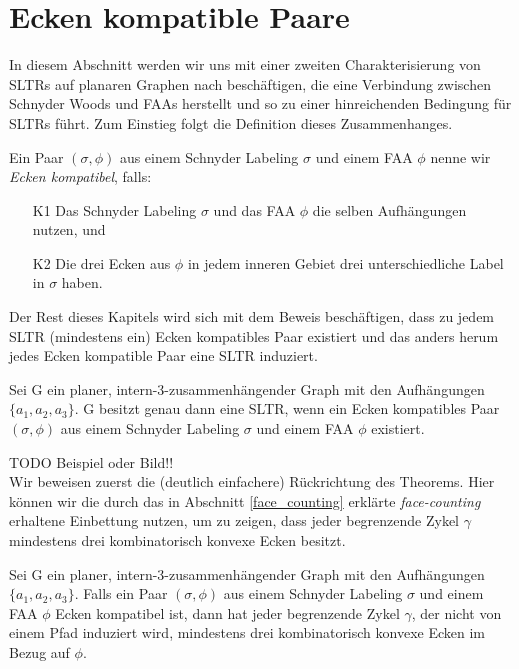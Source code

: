 \section{Ecken kompatible Paare}

In diesem Abschnitt werden wir uns mit einer zweiten Charakterisierung von SLTRs auf planaren Graphen nach \cite{af15} beschäftigen, die eine Verbindung zwischen Schnyder Woods und FAAs herstellt und so zu einer hinreichenden Bedingung für SLTRs führt. Zum Einstieg folgt die Definition dieses Zusammenhanges.

\begin{definition}\label{def_ccc}
Ein Paar $(\sigma,\phi)$ aus einem Schnyder Labeling $\sigma$ und einem FAA $\phi$ nenne wir \textit{Ecken kompatibel}, falls:
\begin{itemize}
\item [K1] Das Schnyder Labeling $\sigma$ und das FAA $\phi$ die selben Aufhängungen nutzen, und
\item [K2] Die drei Ecken aus $\phi$ in jedem inneren Gebiet drei unterschiedliche Label in $\sigma$ haben.
\end{itemize}
\end{definition}

Der Rest dieses Kapitels wird sich mit dem Beweis beschäftigen, dass zu jedem SLTR (mindestens ein) Ecken kompatibles Paar existiert und das anders herum jedes Ecken kompatible Paar eine SLTR induziert.

\begin{theorem}
\label{theo_ccc}
Sei G ein planer, intern-3-zusammenhängender Graph mit den Aufhängungen $\{a_1,a_2,a_3\}$. G besitzt genau dann eine SLTR, wenn ein Ecken kompatibles Paar $(\sigma,\phi)$ aus einem Schnyder Labeling $\sigma$ und einem FAA $\phi$ existiert.
\end{theorem}

TODO Beispiel oder Bild!! \\

Wir beweisen zuerst die (deutlich einfachere) Rückrichtung des Theorems. Hier können wir die durch das in Abschnitt \ref{face_counting} erklärte \textit{face-counting} erhaltene Einbettung nutzen, um zu zeigen, dass jeder begrenzende Zykel $\gamma$ mindestens drei kombinatorisch konvexe Ecken besitzt. 

\begin{lemma}\label{lem1}
Sei G ein planer, intern-3-zusammenhängender Graph mit den Aufhängungen $\{a_1,a_2,a_3\}$. Falls ein Paar $(\sigma,\phi)$ aus einem Schnyder Labeling $\sigma$ und einem FAA $\phi$ Ecken kompatibel ist, dann hat jeder begrenzende Zykel $\gamma$, der nicht von einem Pfad induziert wird, mindestens drei kombinatorisch konvexe Ecken im Bezug auf $\phi$.
\end{lemma}

